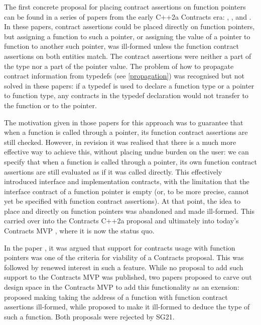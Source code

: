 The first concrete proposal for placing contract assertions on function pointers can be found in a series of papers from the early C++2a Contracts era: \cite{N4415}, \cite{P0287R0}, and \cite{P0380R0}. In these papers, contract assertions could be placed directly on function pointers, but assigning a function to such a pointer, or assigning the value of a pointer to function to another such pointer, was ill-formed unless the function contract assertions on both entities match. The contract assertions were neither a part of the type nor a part of the pointer value. The problem of how to propagate contract information from typedefs (see \ref{propagation}) was recognised but not solved in these papers:  if a typedef is used to declare a function type or a pointer to function type, any contracts in the typedef declaration would not transfer to the function or to the pointer.

The motivation given in those papers for this approach was to guarantee that when a function is called through a pointer, its function contract assertions are still checked. However, in revision \cite{P0380R1} it was realised that there is a much more effective way to achieve this, without placing undue burden on the user: we can specify that when a function is called through a pointer, its own function contract assertions are still evaluated as if it was called directly. This effectively introduced interface and implementation contracts, with the limitation that the interface contract of a function pointer is empty  (or, to be more precise, cannot yet be specified with function contract assertions). At that point, the idea to place  and  directly on function pointers was abandoned and made ill-formed. This carried over into the Contracts C++2a proposal \cite{P0542R5} and ultimately into today's Contracts MVP \cite{P2900R8}, where it is now the status quo.

In the paper \cite{P3173R0}, it was argued that support for contracts usage with function pointers was one of the criteria for viability of a Contracts proposal. This was followed by renewed interest in such a feature. While no proposal to add such support to the Contracts MVP was published, two papers proposed to carve out design space in the Contracts MVP to add this functionality as an exension: \cite{P3221R0} proposed making taking the address of a function with function contract assertions ill-formed, while \cite{P3250R0} proposed to make it ill-formed to deduce the type of such a function. Both proposals were rejected by SG21.

